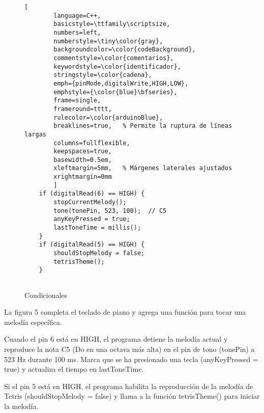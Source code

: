 
\setlength{\parindent}{0pt}
\setlength{\parskip}{6pt}
\begin{figure}[H]
	\centering
	\begin{lstlisting}[
		language=C++,
		basicstyle=\ttfamily\scriptsize,
		numbers=left,
		numberstyle=\tiny\color{gray},
		backgroundcolor=\color{codeBackground},
		commentstyle=\color{comentarios},
		keywordstyle=\color{identificador},
		stringstyle=\color{cadena},
		emph={pinMode,digitalWrite,HIGH,LOW},
		emphstyle={\color{blue}\bfseries},
		frame=single,
		frameround=tttt,
		rulecolor=\color{arduinoBlue},
		breaklines=true,   % Permite la ruptura de líneas largas
		columns=fullflexible,
		keepspaces=true,
		basewidth=0.5em,
		xleftmargin=5mm,   % Márgenes laterales ajustados
		xrightmargin=0mm
		]
	if (digitalRead(6) == HIGH) {
		stopCurrentMelody();
		tone(tonePin, 523, 100);  // C5
		anyKeyPressed = true;
		lastToneTime = millis();
	}
	if (digitalRead(5) == HIGH) {
		shouldStopMelody = false;
		tetrisTheme();
	}
	
	\end{lstlisting}
	\caption{Condicionales}
	\label{fig:codigo-led}
\end{figure}
La figura 5 completa el teclado de piano y agrega una función para tocar una melodía específica.

Cuando el pin 6 está en HIGH, el programa detiene la melodía actual y reproduce la nota C5 (Do en una octava más alta) en el pin de tono (tonePin) a 523 Hz durante 100 ms. Marca que se ha presionado una tecla (anyKeyPressed = true) y actualiza el tiempo en lastToneTime.

Si el pin 5 está en HIGH, el programa habilita la reproducción de la melodía de Tetris (shouldStopMelody = false) y llama a la función tetrisTheme() para iniciar la melodía.
 